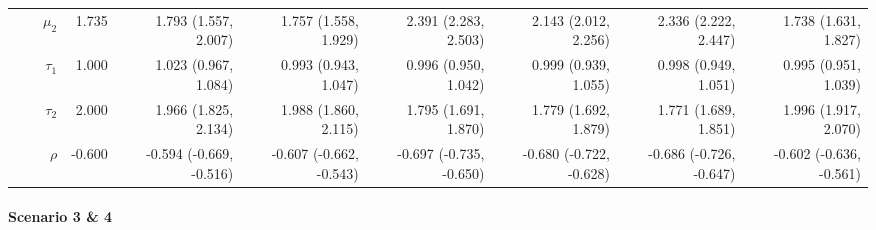 \documentclass[
]{article}
\begin{document}
\begin{table}
\begin{tabular}[t]{rrrrrrrrrr}
 &  & $\mu_2$ & 1.735 & 1.793 (1.557, 2.007) & 1.757 (1.558, 1.929) & 2.391 (2.283, 2.503) & 2.143 (2.012, 2.256) & 2.336 (2.222, 2.447) & 1.738 (1.631, 1.827)\\
 &  & $\tau_1$ & 1.000 & 1.023 (0.967, 1.084) & 0.993 (0.943, 1.047) & 0.996 (0.950, 1.042) & 0.999 (0.939, 1.055) & 0.998 (0.949, 1.051) & 0.995 (0.951, 1.039)\\
 &  & $\tau_2$ & 2.000 & 1.966 (1.825, 2.134) & 1.988 (1.860, 2.115) & 1.795 (1.691, 1.870) & 1.779 (1.692, 1.879) & 1.771 (1.689, 1.851) & 1.996 (1.917, 2.070)\\
 &  & $\rho$ & -0.600 & -0.594 (-0.669, -0.516) & -0.607 (-0.662, -0.543) & -0.697 (-0.735, -0.650) & -0.680 (-0.722, -0.628) & -0.686 (-0.726, -0.647) & -0.602 (-0.636, -0.561)\\
\bottomrule
\end{tabular}
\end{table}

\hypertarget{scenario-3-4}{%
\paragraph{Scenario 3 \& 4}\label{scenario-3-4}}
\end{document}
